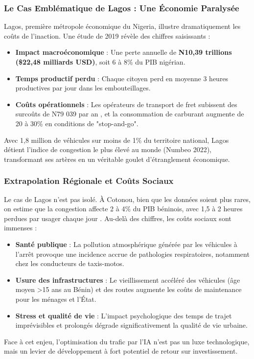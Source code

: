 \subsubsection{Le Cas Emblématique de Lagos : Une Économie Paralysée}
\label{subsubsec:cas_lagos_unifie}

Lagos, première métropole économique du Nigeria, illustre dramatiquement les coûts de l'inaction. Une étude de 2019 \cite{dannelagos2019} révèle des chiffres saisissants :
\begin{itemize}
    \item \textbf{Impact macroéconomique} : Une perte annuelle de \textbf{N10,39 trillions (\$22,48 milliards USD)}, soit 6 à 8\% du PIB nigérian.
    \item \textbf{Temps productif perdu} : Chaque citoyen perd en moyenne 3 heures productives par jour dans les embouteillages.
    \item \textbf{Coûts opérationnels} : Les opérateurs de transport de fret subissent des surcoûts de N79 039 par an \cite{researchgate2024}, et la consommation de carburant augmente de 20 à 30\% en conditions de "stop-and-go".
\end{itemize}
Avec 1,8 million de véhicules sur moins de 1\% du territoire national, Lagos détient l'indice de congestion le plus élevé au monde (Numbeo 2022), transformant ses artères en un véritable goulet d'étranglement économique.

\subsubsection{Extrapolation Régionale et Coûts Sociaux}
\label{subsubsec:extrapolation_regionale_unifie}

Le cas de Lagos n'est pas isolé. À Cotonou, bien que les données soient plus rares, on estime que la congestion affecte 2 à 4\% du PIB béninois, avec 1,5 à 2 heures perdues par usager chaque jour \cite{fousseni2014}. Au-delà des chiffres, les coûts sociaux sont immenses :
\begin{itemize}
    \item \textbf{Santé publique} : La pollution atmosphérique générée par les véhicules à l'arrêt provoque une incidence accrue de pathologies respiratoires, notamment chez les conducteurs de taxis-motos.
    \item \textbf{Usure des infrastructures} : Le vieillissement accéléré des véhicules (âge moyen >15 ans au Bénin) et des routes augmente les coûts de maintenance pour les ménages et l'État.
    \item \textbf{Stress et qualité de vie} : L'impact psychologique des temps de trajet imprévisibles et prolongés dégrade significativement la qualité de vie urbaine.
\end{itemize}
Face à cet enjeu, l'optimisation du trafic par l'IA n'est pas un luxe technologique, mais un levier de développement à fort potentiel de retour sur investissement.

